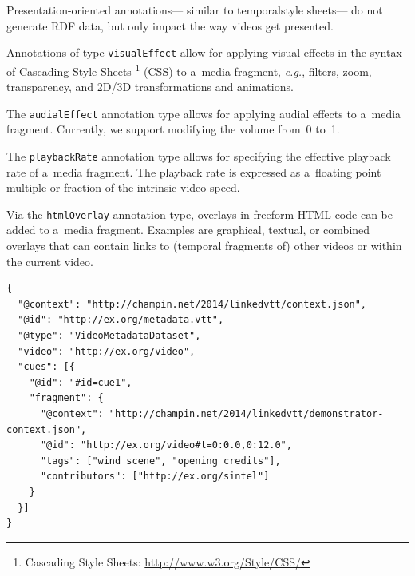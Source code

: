 \documentclass{sig-alternate}
\newcommand{\inlinelistingsize}{\fontsize{8pt}{11pt}}
\let\oldurl\url
\renewcommand{\url}[1]{\inlinelistingsize\oldurl{#1}}
\def\JSONLD{\mbox{JSON-LD}}
\begin{document}
Presentation-oriented annotations---%
similar to temporal\linebreak style sheets---%
do not generate RDF data,
but only impact the way videos get presented.\\

\begin{description}[leftmargin=*]
  \item[Visual Effect] Annotations of
  type \texttt{visualEffect} allow for applying visual effects
  in the syntax of Cascading Style Sheets%
  \footnote{Cascading Style Sheets:
  \url{http://www.w3.org/Style/CSS/}} (CSS)
  to a~media fragment, \emph{e.g.},
  filters, zoom, transparency,
  and 2D/3D transformations and animations.

  \item[Audial Effect] The \texttt{audialEffect} annotation type
  allows for applying audial effects to a~media fragment.
  Currently, we support modifying the volume
  from~0 to~1.

  \item[Playback Rate] The \texttt{playbackRate}
  annotation type allows for specifying the effective
  playback rate of a~media fragment.
  The playback rate is expressed as a~floating point
  multiple or fraction of the intrinsic video speed.

  \item[HTML Overlay] Via the \texttt{htmlOverlay}
  annotation type, overlays in
  freeform HTML code can be added to a~media fragment.
  Examples are graphical, textual, or combined overlays
  that can contain links to (temporal fragments of)
  other videos or within the current video.
\end{description}

\begin{lstlisting}[caption={Generated \JSONLD\ file based on the WebVTT file 
    shown in \autoref{listing:webvtt}~(flat interpretation)},
  label=listing:jsonld, float=t!]
{
  "@context": "http://champin.net/2014/linkedvtt/context.json",
  "@id": "http://ex.org/metadata.vtt", 
  "@type": "VideoMetadataDataset",
  "video": "http://ex.org/video", 
  "cues": [{
    "@id": "#id=cue1",
    "fragment": {
      "@context": "http://champin.net/2014/linkedvtt/demonstrator-context.json", 
      "@id": "http://ex.org/video#t=0:0.0,0:12.0", 
      "tags": ["wind scene", "opening credits"],
      "contributors": ["http://ex.org/sintel"]
    }
  }]
}
\end{lstlisting}
\end{document}

